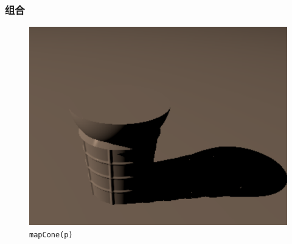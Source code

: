 \documentclass[aspectratio=169]{ctexbeamer} %
\begin{document}
\begin{frame}
    \frametitle{组合}
    \begin{figure}[htbp]
        \centering
        \includegraphics[height=.75\textheight]{images/pre/cone/final.pdf}
        \caption{\texttt{mapCone(p)}}
        \label{fig:cone_model}
    \end{figure}
\end{frame}
\end{document}
